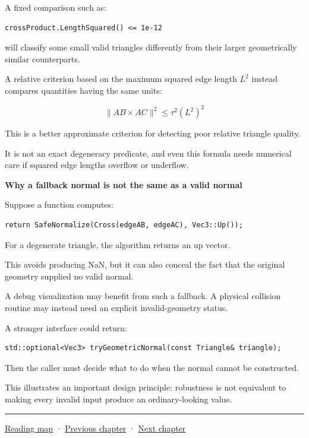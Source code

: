 A fixed comparison such as:

\begin{verbatim}
crossProduct.LengthSquared() <= 1e-12
\end{verbatim}

will classify some small valid triangles differently from their larger geometrically similar counterparts.

A relative criterion based on the maximum squared edge length \(L^2\) instead compares quantities having the same units:

\[
\boxed{ \|AB\times AC\|^2\le\tau^2(L^2)^2 }
\]

This is a better approximate criterion for detecting poor relative triangle quality.

It is not an exact degeneracy predicate, and even this formula needs numerical care if squared edge lengths overflow or underflow.

\textbf{Why a fallback normal is not the same as a valid normal}

Suppose a function computes:

\begin{verbatim}
return SafeNormalize(Cross(edgeAB, edgeAC), Vec3::Up());
\end{verbatim}

For a degenerate triangle, the algorithm returns an up vector.

This avoids producing NaN, but it can also conceal the fact that the original geometry supplied no valid normal.

A debug visualization may benefit from such a fallback. A physical collision routine may instead need an explicit invalid-geometry status.

A stronger interface could return:

\begin{verbatim}
std::optional<Vec3> tryGeometricNormal(const Triangle& triangle);
\end{verbatim}

Then the caller must decide what to do when the normal cannot be constructed.

This illustrates an important design principle: robustness is not equivalent to making every invalid input produce an ordinary-looking value.

\begin{center}\rule{0.5\linewidth}{0.5pt}\end{center}

\hyperref[volume-reading-map]{Reading map} · \hyperref[03-visual-computing-i-ch019-textures-as-sampled-surface-signals]{Previous chapter} · \hyperref[03-visual-computing-i-ch021-collision-implementations-and-repository-comparison]{Next chapter}
